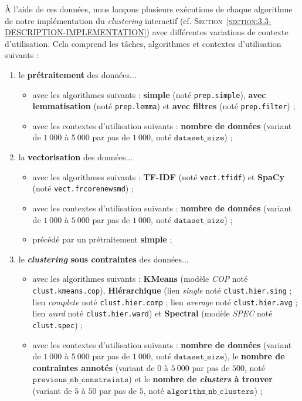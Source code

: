 			À l'aide de ces données, nous lançons plusieurs exécutions de chaque algorithme de notre implémentation du \textit{clustering} interactif (cf. \textsc{Section~\ref{section:3.3-DESCRIPTION-IMPLEMENTATION}}) avec différentes variations de contexte d'utilisation.
			Cela comprend les tâches, algorithmes et contextes d'utilisation suivants :
			\begin{enumerate}
				\item le \textbf{prétraitement} des données...
					\begin{itemize}
						\item avec les algorithmes suivants : \textbf{simple} (noté \texttt{prep.simple}), \textbf{avec lemmatisation} (noté \texttt{prep.lemma}) et \textbf{avec filtres} (noté \texttt{prep.filter}) ;
						\item avec les contextes d'utilisation suivants : \textbf{nombre de données} (variant de $1~000$ à $5~000$ par pas de $1~000$, noté $\texttt{dataset\_size}$) ;
					\end{itemize}
				\item la \textbf{vectorisation} des données...
					\begin{itemize}
						\item avec les algorithmes suivants : \textbf{TF-IDF} (noté \texttt{vect.tfidf}) et \textbf{SpaCy} (noté \texttt{vect.frcorenewsmd}) ;
						\item avec les contextes d'utilisation suivants : \textbf{nombre de données} (variant de $1~000$ à $5~000$ par pas de $1~000$, noté $\texttt{dataset\_size}$) ;
						\item précédé par un prétraitement \textbf{simple} ;
					\end{itemize}
				\item le \textbf{\textit{clustering} sous contraintes} des données...
					\begin{itemize}
						\item avec les algorithmes suivants : \textbf{KMeans} (modèle \textit{COP} noté \texttt{clust.kmeans.cop}), \textbf{Hiérarchique} (lien \textit{single} noté \texttt{clust.hier.sing} ; lien \textit{complete} noté \texttt{clust.hier.comp} ; lien \textit{average} noté \texttt{clust.hier.avg} ; lien \textit{ward} noté \texttt{clust.hier.ward}) et \textbf{Spectral} (modèle \textit{SPEC} noté \texttt{clust.spec}) ;
						\item avec les contextes d'utilisation suivants : \textbf{nombre de données} (variant de $1~000$ à $5~000$ par pas de $1~000$, noté $\texttt{dataset\_size}$), le \textbf{nombre de contraintes annotés} (variant de $0$ à $5~000$ par pas de $500$, noté $\texttt{previous\_nb\_constraints}$) et le \textbf{nombre de \textit{clusters} à trouver} (variant de $5$ à $50$ par pas de $5$, noté $\texttt{algorithm\_nb\_clusters}$) ;

\end{itemize}
\end{enumerate}
